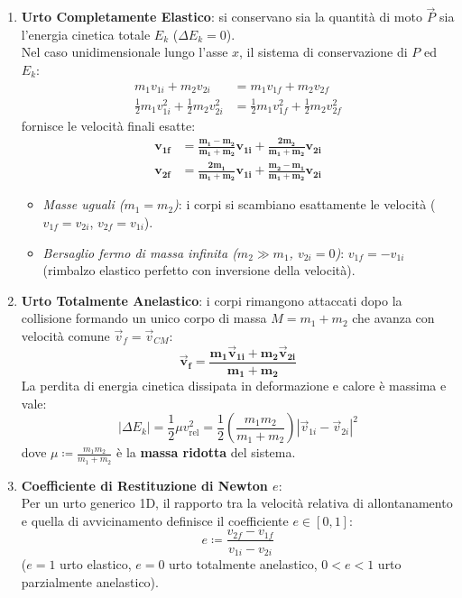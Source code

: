 \begin{enumerate}
    \item \textbf{Urto Completamente Elastico}: si conservano sia la quantità di moto $\vec{P}$ sia l'energia cinetica totale $E_k$ ($\Delta E_k = 0$).\\
    Nel caso unidimensionale lungo l'asse $x$, il sistema di conservazione di $P$ ed $E_k$:
    \begin{align}
        m_1 v_{1i} + m_2 v_{2i} &= m_1 v_{1f} + m_2 v_{2f} \\
        \frac{1}{2}m_1 v_{1i}^2 + \frac{1}{2}m_2 v_{2i}^2 &= \frac{1}{2}m_1 v_{1f}^2 + \frac{1}{2}m_2 v_{2f}^2
    \end{align}
    fornisce le velocità finali esatte:
    \begin{align}
        \mathbf{v_{1f}} &= \mathbf{\frac{m_1 - m_2}{m_1 + m_2}v_{1i} + \frac{2 m_2}{m_1 + m_2}v_{2i}} \label{eq:urto_el_1} \\
        \mathbf{v_{2f}} &= \mathbf{\frac{2 m_1}{m_1 + m_2}v_{1i} + \frac{m_2 - m_1}{m_1 + m_2}v_{2i}} \label{eq:urto_el_2}
    \end{align}
    \begin{itemize}
        \item \emph{Masse uguali ($m_1 = m_2$)}: i corpi si scambiano esattamente le velocità ($v_{1f} = v_{2i}$, $v_{2f} = v_{1i}$).
        \item \emph{Bersaglio fermo di massa infinita ($m_2 \gg m_1$, $v_{2i} = 0$)}: $v_{1f} = -v_{1i}$ (rimbalzo elastico perfetto con inversione della velocità).
    \end{itemize}

    \item \textbf{Urto Totalmente Anelastico}: i corpi rimangono attaccati dopo la collisione formando un unico corpo di massa $M = m_1 + m_2$ che avanza con velocità comune $\vec{v}_f = \vec{v}_{CM}$:
    \begin{equation}
        \mathbf{\vec{v}_f = \frac{m_1\vec{v}_{1i} + m_2\vec{v}_{2i}}{m_1 + m_2}}
        \label{eq:urto_anel_vf}
    \end{equation}
    La perdita di energia cinetica dissipata in deformazione e calore è massima e vale:
    \begin{equation}
        |\Delta E_k| = \frac{1}{2}\mu v_{\text{rel}}^2 = \frac{1}{2}\left(\frac{m_1 m_2}{m_1 + m_2}\right)|\vec{v}_{1i} - \vec{v}_{2i}|^2
        \label{eq:delta_ek_anelastico}
    \end{equation}
    dove $\mu \coloneqq \frac{m_1 m_2}{m_1 + m_2}$ è la \textbf{massa ridotta} del sistema.

    \item \textbf{Coefficiente di Restituzione di Newton $e$}:\\
    Per un urto generico 1D, il rapporto tra la velocità relativa di allontanamento e quella di avvicinamento definisce il coefficiente $e \in [0, 1]$:
    \begin{equation}
        e \coloneqq \frac{v_{2f} - v_{1f}}{v_{1i} - v_{2i}}
    \end{equation}
    ($e=1$ urto elastico, $e=0$ urto totalmente anelastico, $0 < e < 1$ urto parzialmente anelastico).
\end{enumerate}


